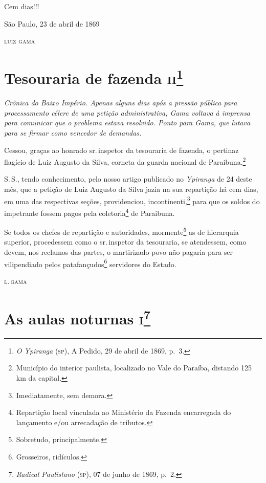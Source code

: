 Cem dias!!!

\begin{flushright}
São Paulo, 23 de abril de 1869

\textsc{luiz gama}
\end{flushright}

\chapter{Tesouraria de fazenda \textsc{ii}\footnote{\emph{O Ypiranga}
  (\textsc{sp}), A Pedido, 29 de abril de 1869, p.~3.}}

\begin{didascalia}\itshape
Crônica do Baixo Império. Apenas alguns dias após a pressão pública para
processamento célere de uma petição administrativa, Gama voltava à
imprensa para comunicar que o problema estava resolvido. Ponto para
Gama, que lutava para se firmar como vencedor de demandas.
\end{didascalia}


Cessou, graças ao honrado sr.\,inspetor da tesouraria de fazenda, o
pertinaz flagício de Luiz Augusto da Silva, corneta da guarda nacional
de Paraibuna.\footnote{Município do interior paulista, localizado no
  Vale do Paraíba, distando 125 km da capital.}

S.\,S., tendo conhecimento, pelo nosso artigo publicado no
\emph{Ypiranga} de 24 deste mês, que a petição de Luiz Augusto da Silva
jazia na sua repartição há cem dias, em uma das respectivas seções,
providenciou, incontinenti,\footnote{Imediatamente, sem demora.} para
que os soldos do impetrante fossem pagos pela coletoria\footnote{
  Repartição local vinculada ao Ministério da Fazenda encarregada do
  lançamento e/ou arrecadação de tributos.} de Paraibuna.

Se todos os chefes de repartição e autoridades, mormente\footnote{
  Sobretudo, principalmente.} as de hierarquia superior, procedessem
como o sr.\,inspetor da tesouraria, se atendessem, como devem, nos
reclamos das partes, o martirizado povo não pagaria para ser
vilipendiado pelos patafançudos\footnote{Grosseiros, ridículos.}
servidores do Estado.

\begin{flushright}
\textsc{l.\,gama}
\end{flushright}

\chapter{As aulas noturnas \textsc{i}\footnote{\emph{Radical Paulistano}
  (\textsc{sp}), 07 de junho de 1869, p.~2.}}


